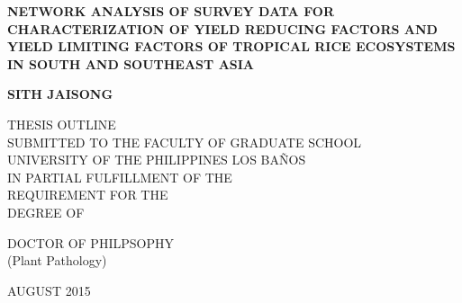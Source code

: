 \pagestyle{empty}

\begin{titlepage}
\begin{spacing}{1}
        \begin{center}
        \vspace*{0cm}

        \large
        {\bf NETWORK ANALYSIS OF SURVEY DATA FOR CHARACTERIZATION OF YIELD REDUCING FACTORS AND YIELD LIMITING FACTORS OF TROPICAL RICE ECOSYSTEMS IN SOUTH AND SOUTHEAST ASIA}

        \vspace*{6.0cm}

        \large
        \bf{SITH JAISONG} \\

        \vspace*{5.0cm}

        \large
        THESIS OUTLINE \\ SUBMITTED TO THE FACULTY OF GRADUATE SCHOOL\\
        UNIVERSITY OF THE PHILIPPINES LOS BA\~NOS\\ 
 IN PARTIAL FULFILLMENT OF THE \\
        REQUIREMENT FOR THE \\ 
        DEGREE OF \\
        \vspace*{2.0cm}
        \begin{singlespace}
        DOCTOR OF PHILPSOPHY \\
        (Plant Pathology) \\
		\end{singlespace}
        \vspace*{2.0cm}
        AUGUST 2015
        \end{center}
        \end{spacing}
\end{titlepage}
\cleardoublepage
\newpage